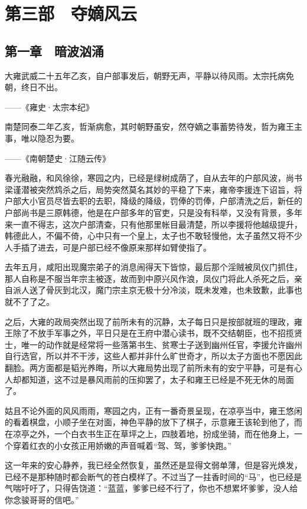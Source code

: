 \part{第三部　夺嫡风云}

\chapter{第一章　暗波汹涌}

大雍武威二十五年乙亥，自户部事发后，朝野无声，平静以待风雨。太宗托病免朝，终日不出。

——《雍史·太宗本纪》

南楚同泰二年乙亥，哲渐病愈，其时朝野虽安，然夺嫡之事蓄势待发，哲为雍王主事，唯以隐忍为要。

——《南朝楚史·江随云传》

春光融融，和风徐徐，寒园之内，已经是绿树成荫了，自从去年的户部风波，尚书梁谨潜被突然鸩杀之后，局势突然莫名其妙的平稳了下来，雍帝李援连下诏旨，将户部大小官员尽皆去职的去职，降级的降级，罚俸的罚俸，户部清洗之后，新任的户部尚书是三原韩德，他是在户部多年的官吏，只是没有科举，又没有背景，多年来一直不得志，这次户部清查，只有他那里帐目最清楚，所以李援将他越级提升，韩德此人，不偏不倚，心中只有一个皇上，太子也不敢轻慢他，太子虽然又将不少人手插了进去，可是户部已经不像原来那样如臂使指了。

去年五月，咸阳出现魔宗弟子的消息闹得天下皆惊，最后那个淫贼被凤仪门抓住，那人自称是不服当年宗主被逐，故而到中原兴风作浪，凤仪门将此人杀死之后，亲自派人送了骨灰到北汉，魔门宗主京无极十分冷淡，既未发难，也未致歉，此事也就不了了之。

之后，大雍的政局突然出现了前所未有的沉静，太子每日只是按部就班的理政，雍王除了不放手军事之外，平日只是在王府中潜心读书，既不交结朝臣，也不招揽贤士，唯一的动作就是经常将一些落第书生、贫寒士子送到幽州任官，李援允许幽州自行选官，所以并不干涉，这些人都并非什么旷世奇才，所以太子方面也不愿因此翻脸。两方面都是韬光养晦，所以大雍局势出现了前所未有的安宁平静，可是有心人却都知道，这不过是暴风雨前的压抑罢了，太子和雍王已经是不死无休的局面了。

姑且不论外面的风风雨雨，寒园之内，正有一番奇景呈现，在凉亭当中，雍王悠闲的看着棋盘，小顺子坐在对面，神色平静的放下了棋子，示意雍王该轮到他了，而在凉亭之外，一个白衣书生正在草坪之上，四肢着地，扮成坐骑，而在他身上，一个穿着红衣的小女孩正用娇嫩的声音喊着“驾、驾，爹爹快跑。”

这一年来的安心静养，我已经全然恢复，虽然还是显得文弱单薄，但是容光焕发，已经不是那种随时都会断气的苍白模样了。不过当了一拄香时间的“马”，也已经是气喘吁吁了，只得告饶道：“蓝蓝，爹爹已经不行了，你也不想累坏爹爹，没人给你念骏哥哥的信吧。”

